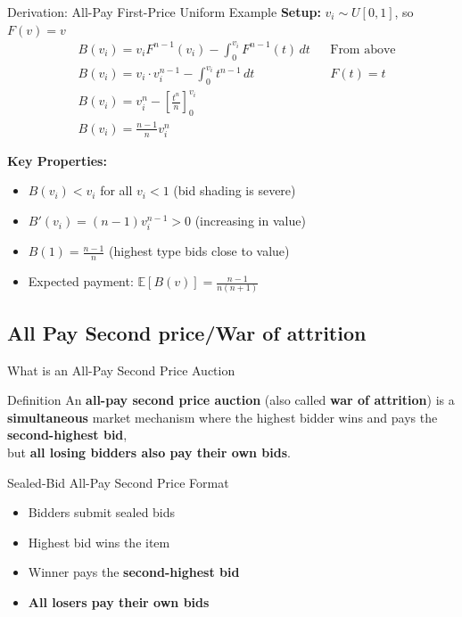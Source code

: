 \documentclass[xcolor={x11names}]{beamer}
\begin{document}
\begin{frame}{Derivation: All-Pay First-Price Uniform Example}
\textbf{Setup:} $v_i \sim U[0,1]$, so $F(v) = v$
\begin{align*}
& B(v_i) = v_i F^{n-1}(v_i) - \int_0^{v_i} F^{n-1}(t) \, dt && \text{From above} \\
& B(v_i) = v_i \cdot v_i^{n-1} - \int_0^{v_i} t^{n-1} \, dt && F(t) = t \\
& B(v_i) = v_i^n - \left[\frac{t^n}{n}\right]_0^{v_i} && \\
& \boxed{B(v_i) = \frac{n-1}{n} v_i^n}  &&
\end{align*}

\textbf{Key Properties:}
\begin{itemize}
  \item $B(v_i) < v_i$ for all $v_i < 1$ (bid shading is severe)
  \item $B'(v_i) = (n-1)v_i^{n-1} > 0$ (increasing in value)
  \item $B(1) = \frac{n-1}{n}$ (highest type bids close to value)
  \item Expected payment: $\mathbb{E}[B(v)] = \frac{n-1}{n(n+1)}$
\end{itemize}
\end{frame}

\subsection{All Pay Second price/War of attrition}
\begin{frame}{What is an All-Pay Second Price Auction}
\begin{block}{Definition}
An \textbf{all-pay second price auction} (also called \textbf{war of attrition}) is a \textbf{simultaneous} market mechanism where the highest bidder wins and pays the \textbf{second-highest bid}, \\
but \textbf{all losing bidders also pay their own bids}.
\end{block}
\begin{exampleblock}{Sealed-Bid All-Pay Second Price Format}
\begin{itemize}
\item Bidders submit sealed bids
\item Highest bid wins the item
\item Winner pays the \textbf{second-highest bid}
\item \textbf{All losers pay their own bids}
\end{itemize}
\end{exampleblock}
\end{frame}
\end{document}

